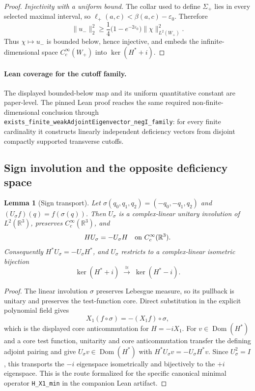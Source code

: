 ﻿\documentclass[11pt]{article}
\newtheorem{lemma}{Lemma}
\begin{document}
\begin{proof}
\textit{Injectivity with a uniform bound.} The collar used to define
\(\Sigma_+\) lies in every selected maximal interval, so
\(\ell_+(a,c)<\beta(a,c)-\varepsilon_0\). Therefore
\[
\|u_-\|_2^2
\ge \frac14\bigl(1-e^{-2\varepsilon_0}\bigr)
\|\chi\|_{L^2(W_+)}^2 .
\]
Thus \(\chi\mapsto u_-\) is bounded below, hence injective, and embeds the
infinite-dimensional space \(C_c^\infty(W_+)\) into \(\ker(H^*+i)\).
\end{proof}

\paragraph{Lean coverage for the cutoff family.}
The displayed bounded-below map and its uniform quantitative constant are
paper-level. The pinned Lean proof reaches the same required
non-finite-dimensional conclusion through
\texttt{exists\_finite\_weakAdjointEigenvector\_negI\_family}: for every
finite cardinality it constructs linearly independent deficiency vectors
from disjoint compactly supported transverse cutoffs.

\subsection{Sign involution and the opposite deficiency space}
\begin{lemma}[Sign transport]
Let
\(\sigma(q_0,q_1,q_2)=(-q_0,-q_1,q_2)\) and
\((U_\sigma f)(q)=f(\sigma(q))\). Then \(U_\sigma\) is a complex-linear
unitary involution of \(L^2(\mathbb{R}^3)\), preserves
\(C_c^\infty(\mathbb{R}^3)\), and
\[
H U_\sigma=-U_\sigma H
\quad\hbox{on }C_c^\infty(\mathbb{R}^3).
\]
Consequently \(H^*U_\sigma=-U_\sigma H^*\), and \(U_\sigma\) restricts to a
complex-linear isometric bijection
\[
\ker(H^*+i)\;\xrightarrow{\;\cong\;}\;\ker(H^*-i).
\]
\end{lemma}
\begin{proof}
The linear involution \(\sigma\) preserves Lebesgue measure, so its pullback is
unitary and preserves the test-function core. Direct substitution in the
explicit polynomial field gives
\[
X_1(f\circ\sigma)=-(X_1f)\circ\sigma,
\]
which is the displayed core anticommutation for \(H=-iX_1\). For
\(v\in\operatorname{Dom}(H^*)\) and a core test function, unitarity and core
anticommutation transfer the defining adjoint pairing and give
\(U_\sigma v\in\operatorname{Dom}(H^*)\) with
\(H^*U_\sigma v=-U_\sigma H^*v\). Since \(U_\sigma^2=I\), this transports the
\(-i\) eigenspace isometrically and bijectively to the \(+i\) eigenspace. This
is the route formalized for the specific canonical minimal operator
\texttt{H\_X1\_min} in the companion Lean artifact.
\end{proof}
\end{document}
